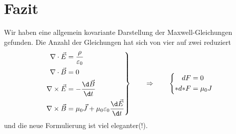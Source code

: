 \section{Fazit}
Wir haben eine allgemein kovariante Darstellung der Maxwell-Gleichungen gefunden. Die Anzahl der Gleichungen hat sich von vier auf zwei reduziert
\[
\left.
\begin{aligned}
	\nabla \cdot \vec{E} &= \frac{\rho}{\varepsilon_0} \\
	\nabla \cdot \vec{B} &= 0 \\
	\nabla \times \vec{E} &= - \frac{\d \vec{B}}{\d t} \\
	\nabla \times \vec{B} &= \mu_0 \vec{J} + \mu_0 \varepsilon_0 \frac{\d \vec{E}}{\d t}
\end{aligned}
\right\}
	\qquad\Rightarrow\qquad
\left\{
	\begin{aligned}
		dF &= 0 \\
	{\ast}d{\ast}F &= \mu_0 J 
\end{aligned}
\right.
\]
und die neue Formulierung ist viel eleganter(!).

